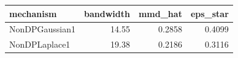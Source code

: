 \begin{tabular}{lrrr}
\toprule
mechanism & bandwidth & mmd_hat & eps_star \\
\midrule
NonDPGaussian1 & 14.55 & 0.2858 & 0.4099 \\
NonDPLaplace1 & 19.38 & 0.2186 & 0.3116 \\
\bottomrule
\end{tabular}
